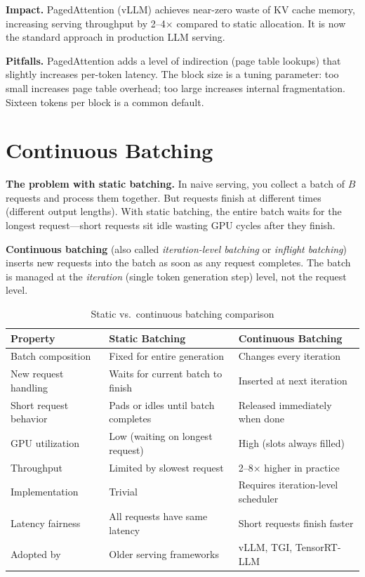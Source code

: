 \textbf{Impact.} PagedAttention (vLLM) achieves near-zero waste of KV cache memory, increasing serving throughput by 2--4$\times$ compared to static allocation. It is now the standard approach in production LLM serving.

\textbf{Pitfalls.} PagedAttention adds a level of indirection (page table lookups) that slightly increases per-token latency. The block size is a tuning parameter: too small increases page table overhead; too large increases internal fragmentation. Sixteen tokens per block is a common default.

\section{Continuous Batching}
\label{sec:continuous_batching}

\textbf{The problem with static batching.} In naive serving, you collect a batch of $B$ requests and process them together. But requests finish at different times (different output lengths). With static batching, the entire batch waits for the longest request---short requests sit idle wasting GPU cycles after they finish.

\textbf{Continuous batching} (also called \textit{iteration-level batching} or \textit{inflight batching}) inserts new requests into the batch as soon as any request completes. The batch is managed at the \textit{iteration} (single token generation step) level, not the request level.

\begin{table}[H]
\centering
\caption{Static vs.\ continuous batching comparison}
\begin{tabularx}{\textwidth}{lXX}
\toprule
\textbf{Property} & \textbf{Static Batching} & \textbf{Continuous Batching} \\
\midrule
Batch composition & Fixed for entire generation & Changes every iteration \\
New request handling & Waits for current batch to finish & Inserted at next iteration \\
Short request behavior & Pads or idles until batch completes & Released immediately when done \\
GPU utilization & Low (waiting on longest request) & High (slots always filled) \\
Throughput & Limited by slowest request & 2--8$\times$ higher in practice \\
Implementation & Trivial & Requires iteration-level scheduler \\
Latency fairness & All requests have same latency & Short requests finish faster \\
Adopted by & Older serving frameworks & vLLM, TGI, TensorRT-LLM \\
\bottomrule
\end{tabularx}
\end{table}

